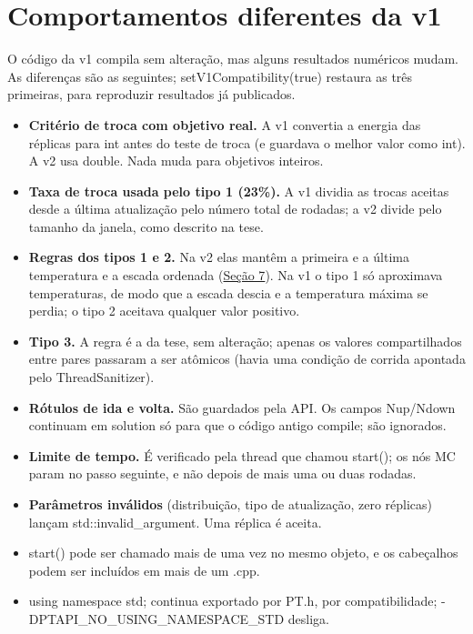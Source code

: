 \documentclass[10pt,a4paper]{article}
\newcommand{\code}[1]{{\ttfamily #1}}
\begin{document}
\section{Comportamentos diferentes da v1}\label{s5}

O código da v1 compila sem alteração, mas alguns resultados numéricos mudam. As diferenças são as seguintes; \code{setV1Compatibility(\allowbreak{}true)} restaura as três primeiras, para reproduzir resultados já publicados.

\begin{itemize}
\item \textbf{Critério de troca com objetivo real.} A v1 convertia a energia das réplicas para \code{int} antes do teste de troca (e guardava o melhor valor como \code{int}). A v2 usa \code{double}. Nada muda para objetivos inteiros.
\item \textbf{Taxa de troca usada pelo tipo 1 (23\%).} A v1 dividia as trocas aceitas desde a última atualização pelo número total de rodadas; a v2 divide pelo tamanho da janela, como descrito na tese.
\item \textbf{Regras dos tipos 1 e 2.} Na v2 elas mantêm a primeira e a última temperatura e a escada ordenada (\hyperref[s7]{Seção 7}). Na v1 o tipo 1 só aproximava temperaturas, de modo que a escada descia e a temperatura máxima se perdia; o tipo 2 aceitava qualquer valor positivo.
\item \textbf{Tipo 3.} A regra é a da tese, sem alteração; apenas os valores compartilhados entre pares passaram a ser atômicos (havia uma condição de corrida apontada pelo ThreadSanitizer).
\item \textbf{Rótulos de ida e volta.} São guardados pela API. Os campos \code{Nup}/\code{Ndown} continuam em \code{solution} só para que o código antigo compile; são ignorados.
\item \textbf{Limite de tempo.} É verificado pela thread que chamou \code{start()}; os nós MC param no passo seguinte, e não depois de mais uma ou duas rodadas.
\item \textbf{Parâmetros inválidos} (distribuição, tipo de atualização, zero réplicas) lançam \code{std::invalid\_\allowbreak{}argument}. Uma réplica é aceita.
\item \code{start()} pode ser chamado mais de uma vez no mesmo objeto, e os cabeçalhos podem ser incluídos em mais de um \code{.cpp}.
\item \code{using namespace std;} continua exportado por \code{PT.h}, por compatibilidade; \code{-DPTAPI\_\allowbreak{}NO\_\allowbreak{}USING\_\allowbreak{}NAMESPACE\_\allowbreak{}STD} desliga. \end{itemize}
\end{document}
